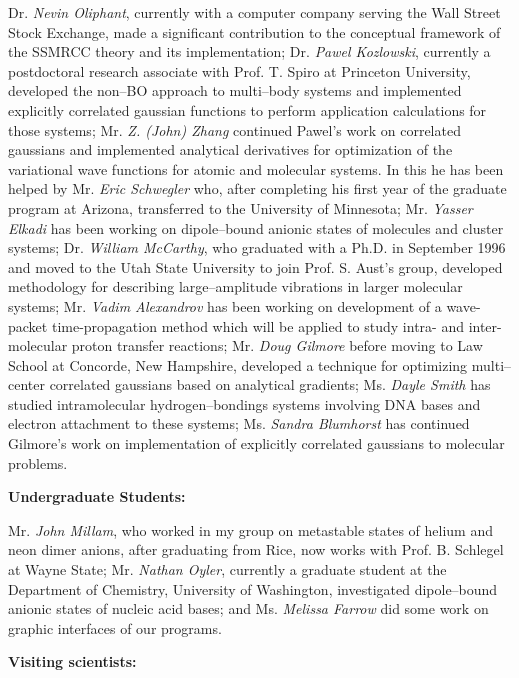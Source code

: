 \noindent
Dr. {\em Nevin Oliphant}, currently 
with a computer company serving the Wall Street Stock Exchange,
made a significant contribution to the conceptual 
framework of the SSMRCC theory and its implementation;
Dr. {\em Pawel Kozlowski}, currently a postdoctoral research 
associate  
with Prof. T. Spiro at
Princeton University, developed the non--BO approach 
to multi--body systems and implemented explicitly
correlated gaussian functions to perform application 
calculations for those systems; 
Mr. {\em Z. (John) Zhang}
continued Pawel's work on correlated gaussians and 
implemented analytical derivatives for optimization of the
variational wave functions for atomic and molecular 
systems.  In this he has been helped by 
Mr. {\em Eric Schwegler} 
who, after completing his first year of the graduate program 
at Arizona, transferred to the University of
Minnesota; 
Mr. {\em Yasser Elkadi}
has been working on 
dipole--bound anionic states of molecules and cluster
systems; 
Dr. {\em William McCarthy}, 
who graduated 
with a Ph.D. in September 1996 and moved to the Utah
State University to join Prof. S. Aust's group,  
developed methodology for describing
large--amplitude vibrations in larger molecular systems; 
Mr. {\em Vadim Alexandrov} has been working on
development of a wave-packet time-propagation method which will
be applied to study intra- and inter-molecular proton transfer
reactions; 
Mr. {\em Doug Gilmore} before moving to Law School at Concorde,
New Hampshire,
developed a technique for
optimizing multi--center correlated gaussians
based on analytical gradients; 
Ms. {\em Dayle Smith} 
has studied 
intramolecular hydrogen--bondings
systems involving DNA bases and electron attachment to these
systems;   
Ms. {\em Sandra Blumhorst} 
has continued Gilmore's work on implementation
of explicitly correlated gaussians to molecular problems.

\vspace{2mm}
\noindent
{\bf Undergraduate Students:}

\noindent
Mr. {\em John Millam}, 
who worked in my group on metastable
states of helium and neon dimer anions,
after graduating from 
Rice, now works with Prof. B. Schlegel at 
Wayne State;
Mr. {\em Nathan Oyler}, 
currently a graduate student at the Department of
Chemistry, University of Washington, investigated 
dipole--bound anionic states of nucleic acid bases; and 
Ms. {\em Melissa Farrow} 
did some work on graphic interfaces of our programs.


\vspace{2mm}
\noindent
{\bf Visiting scientists:}


